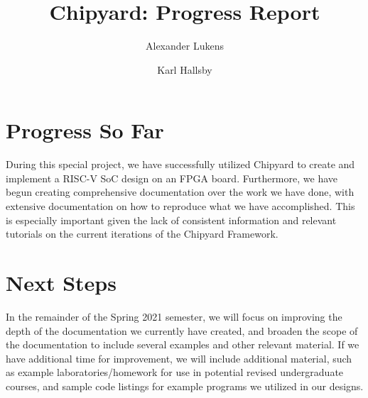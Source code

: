 \documentclass[10pt,letterpaper,final,twoside,notitlepage]{article}
\title{Chipyard: Progress Report}
\author{Alexander Lukens \and Karl Hallsby}
\affil{ECE Department, Illinois Institute of Technology}
\date{\DTMdisplaydate{2021}{4}{11}{-1}} %
\begin{document}
\maketitle
{} %



\section{Progress So Far} \label{sec:Progress_so_far}

During this special project, we have successfully utilized Chipyard to create and implement a RISC-V SoC design on an FPGA board. Furthermore, we have begun creating comprehensive documentation over the work we have done, with extensive documentation on how to reproduce what we have accomplished. This is especially important given the lack of consistent information and relevant tutorials on the current iterations of the Chipyard Framework.

\section{Next Steps}\label{sec:Next_Steps}

In the remainder of the Spring 2021 semester, we will focus on improving the depth of the documentation we currently have created, and broaden the scope of the documentation to include several examples and other relevant material. If we have additional time for improvement, we will include additional material, such as example laboratories/homework for use in potential revised undergraduate courses, and sample code listings for example programs we utilized in our designs. 





\end{document}
